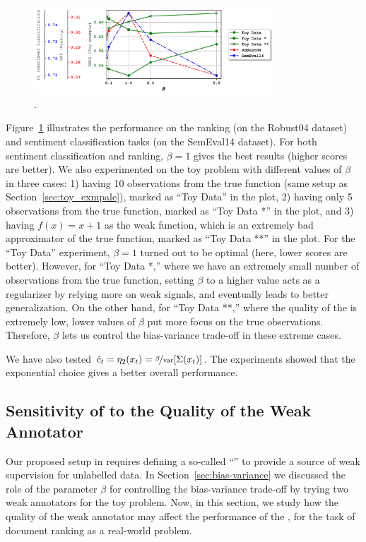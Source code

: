 %
\begin{figure}[!t]
    \centering
    \includegraphics[width=0.8\textwidth]{03-part-02/chapter-05/figs_and_tables/plot_beta_fwl.png}
    \caption{\fontsize{8}{7}\selectfont{Effect of different values for $\beta$}.}
    \label{fig:beta}
\end{figure}
Figure~\ref{fig:beta} illustrates the performance on the ranking (on the Robust04 dataset) and sentiment classification tasks (on the SemEval14 dataset).  For both sentiment classification and ranking, $\beta=1$ gives the best results (higher scores are better).
%
We also experimented on the toy problem with different values of $\beta$ in three cases: 
1) having 10 observations from the true function (same setup as Section~\ref{sec:toy_exmpale}), marked as ``Toy Data'' in the plot, 
2) having only 5 observations from the true function, marked as ``Toy Data *'' in the plot, and 
3) having $f(x) = x + 1$ as the weak function, which is an extremely bad approximator of the true function, marked as ``Toy Data **'' in the plot.
%
For the ``Toy Data'' experiment, $\beta=1$ turned out to be optimal (here, lower scores are better). However, for ``Toy Data *,'' where we have an extremely small number of observations from the true function, setting $\beta$ to a higher value acts as a regularizer by relying more on weak signals, and eventually leads to better generalization. 
On the other hand, for ``Toy Data **,'' where the quality of the \wa is extremely low, lower values of $\beta$ put more focus on the true observations. Therefore, $\beta$ lets us control the bias-variance trade-off in these extreme cases.

We have also tested $\hat{c}_t = \eta_2(x_t) = \nicefrac{\beta}{\rm var}[\Sigma(x_t)]$.  The experiments showed that the exponential choice gives a better overall performance. 


\subsection{Sensitivity of \fwl to the Quality of the Weak Annotator}
Our proposed setup in \fwl requires defining a so-called ``\wa'' to provide a source of weak supervision for unlabelled data. In Section~\ref{sec:bias-variance} we discussed the role of the parameter $\beta$ for controlling the bias-variance trade-off by trying two weak annotators for the toy problem. 
Now, in this section, we study how the quality of the weak annotator may affect the performance of the \fwl, for the task of document ranking as a real-world problem.

